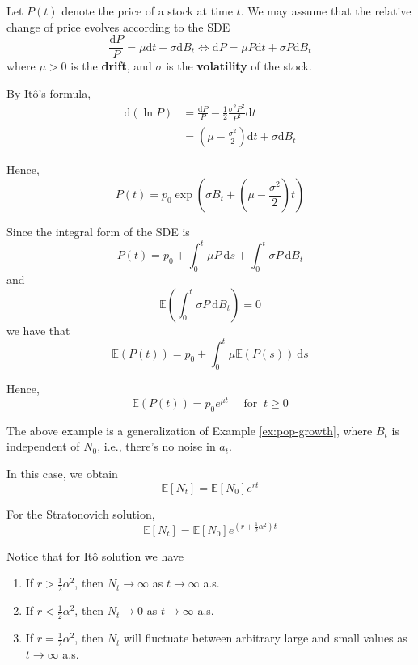 \begin{example}
    Let $P(t)$ denote the price of a stock at time $t$. We may assume that the relative change of price evolves according to the SDE 
    \[
        \frac{\mathrm{d} P}{P} = \mu \mathrm{d}t + \sigma \mathrm{d} B_t \iff \mathrm{d} P = \mu P \mathrm{d}t + \sigma P \mathrm{d} B_t
    \]
    where $\mu > 0$ is the \textbf{drift}, and $\sigma$ is the \textbf{volatility} of the stock. 

    By Itô's formula,
    \begin{equation*}
        \begin{aligned}
            \mathrm{d}(\ln P) &= \frac{\mathrm{d} P}{P} - \frac{1}{2} \frac{\sigma^2 P^2}{P^2} \mathrm{d}t \\
            &= \left( \mu - \frac{\sigma^2}{2} \right) \mathrm{d}t + \sigma \mathrm{d} B_t
        \end{aligned}
    \end{equation*}

    Hence,
    \[
        P(t) = p_0 \exp \left( \sigma B_t + \left( \mu - \frac{\sigma^2}{2} \right) t \right)
    \]

    Since the integral form of the SDE is 
    \[
        P(t) = p_0 + \int_0^t \mu P~\mathrm{d}s + \int_0^t \sigma P~\mathrm{d}B_t
    \]
    and 
    \[
        \mathbb{E} \left( \int_0^t \sigma P ~\mathrm{d}B_t \right) = 0  
    \]
    we have that
    \[
        \mathbb{E}(P(t)) = p_0 + \int_0^t \mu \mathbb{E}(P(s))~\mathrm{d}s
    \]

    Hence, 
    \[
        \mathbb{E}(P(t)) = p_0 e^{\mu t} \quad \text{ for } ~ t \geq 0
    \]
\end{example}

The above example is a generalization of Example \ref{ex:pop-growth}, where $B_t$ is independent of $N_0$, i.e., there's no noise in $a_t$. 

In this case, we obtain
\[
    \mathbb{E}[N_t] = \mathbb{E}[N_0] e^{rt}
\]

For the Stratonovich solution,
\[
    \mathbb{E}[N_t] = \mathbb{E}[N_0] e^{\left( r+\frac{1}{2} \alpha^2 \right) t}
\]

Notice that for Itô solution we have 
\begin{enumerate}
    \item If $r > \frac{1}{2} \alpha^2$, then $N_t \to \infty$ as $t \to \infty$ a.s.
    \item If $r < \frac{1}{2} \alpha^2$, then $N_t \to 0$ as $t \to \infty$ a.s.
    \item If $r = \frac{1}{2} \alpha^2$, then $N_t$ will fluctuate between arbitrary large and small values as $t \to \infty$ a.s.
\end{enumerate}

